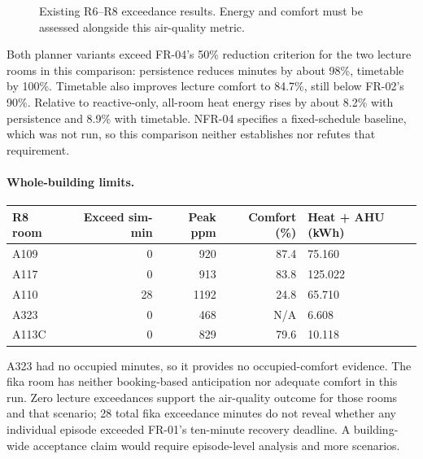 \documentclass[11pt,a4paper]{article}
\begin{document}
\begin{figure}[H]\centering
{}
\caption{Existing R6--R8 exceedance results. Energy and comfort must be assessed alongside this air-quality metric.}\label{fig:results}
\end{figure}
Both planner variants exceed FR-04's 50\% reduction criterion for the two lecture rooms in this comparison: persistence reduces minutes by about 98\%, timetable by 100\%. Timetable also improves lecture comfort to 84.7\%, still below FR-02's 90\%. Relative to reactive-only, all-room heat energy rises by about 8.2\% with persistence and 8.9\% with timetable. NFR-04 specifies a fixed-schedule baseline, which was not run, so this comparison neither establishes nor refutes that requirement.

\paragraph{Whole-building limits.}\mbox{}\par
\noindent\begin{tabularx}{\linewidth}{lrrrX}\toprule R8 room & Exceed sim-min & Peak ppm & Comfort (\%) & Heat + AHU (kWh)\\\midrule
A109 & 0 & 920 & 87.4 & 75.160\\
A117 & 0 & 913 & 83.8 & 125.022\\
A110 & 28 & 1192 & 24.8 & 65.710\\
A323 & 0 & 468 & N/A & 6.608\\
A113C & 0 & 829 & 79.6 & 10.118\\\bottomrule\end{tabularx}
A323 had no occupied minutes, so it provides no occupied-comfort evidence. The fika room has neither booking-based anticipation nor adequate comfort in this run. Zero lecture exceedances support the air-quality outcome for those rooms and that scenario; 28 total fika exceedance minutes do not reveal whether any individual episode exceeded FR-01's ten-minute recovery deadline. A building-wide acceptance claim would require episode-level analysis and more scenarios.
\end{document}
